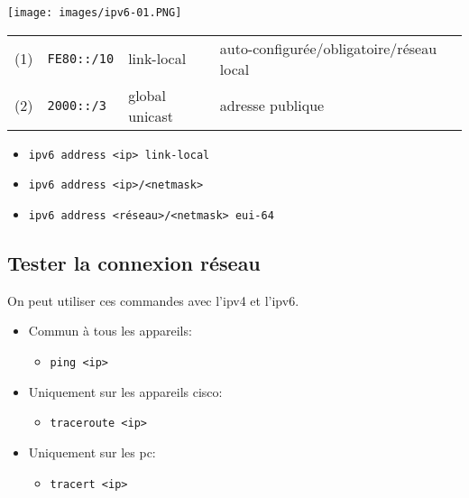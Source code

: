 \documentclass[a4paper]{article}
\begin{document}
\begin{center}
    \texttt{[image: images/ipv6-01.PNG]}
\end{center}
\begin{center}
    \begin{tabular}{llll}
        (1) & \texttt{FE80::/10} & link-local     & auto-configurée/obligatoire/réseau local \\
        (2) & \texttt{2000::/3}  & global unicast & adresse publique \\
    \end{tabular}
\end{center}
\begin{itemize}[label=\textbf{–}]
    \item \texttt{ipv6 address <ip> link-local}
    \item \texttt{ipv6 address <ip>/<netmask>}
    \item \texttt{ipv6 address <réseau>/<netmask> eui-64}
\end{itemize}





\subsection{Tester la connexion réseau}



On peut utiliser ces commandes avec l'ipv4 et l'ipv6.
\begin{itemize}
    \item Commun à tous les appareils:
    \begin{itemize}
        \item \texttt{ping <ip>}
    \end{itemize}
    \item Uniquement sur les appareils cisco:
    \begin{itemize}
        \item \texttt{traceroute <ip>}
    \end{itemize}
    \item Uniquement sur les pc:
    \begin{itemize}
        \item \texttt{tracert <ip>}
    \end{itemize}
\end{itemize}
\end{document}
